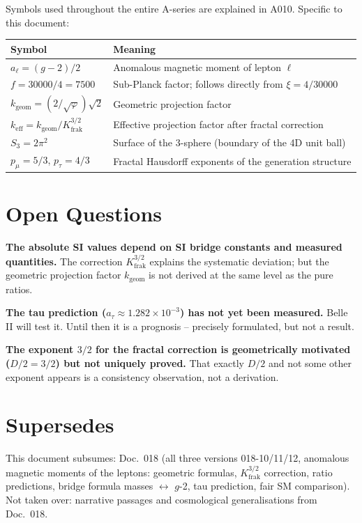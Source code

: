 Symbols used throughout the entire A-series are explained in A010.
Specific to this document:

\begin{center}
\renewcommand{\arraystretch}{1.3}
{\small\begin{tabular}{lp{9cm}}
\toprule
Symbol & Meaning \\
\midrule
$a_\ell = (g-2)/2$ & Anomalous magnetic moment of lepton $\ell$ \\
$f = 30000/4 = 7500$ & Sub-Planck factor; follows directly from $\xi=4/30000$ \\
$k_\text{geom} = (2/\sqrt\varphi)\sqrt2$ & Geometric projection factor \\
$k_\text{eff} = k_\text{geom}/K_\text{frak}^{3/2}$ & Effective projection factor
  after fractal correction \\
$S_3 = 2\pi^2$ & Surface of the 3-sphere (boundary of the 4D unit ball) \\
$p_\mu = 5/3$, $p_\tau = 4/3$ & Fractal Hausdorff exponents of the
  generation structure \\
\bottomrule
\end{tabular}}
\renewcommand{\arraystretch}{1.0}
\end{center}

\section{Open Questions}

\textbf{The absolute SI values depend on SI bridge constants and measured
quantities.} The correction $K_\text{frak}^{3/2}$ explains the systematic
deviation; but the geometric projection factor $k_\text{geom}$ is not derived
at the same level as the pure ratios.

\textbf{The tau prediction ($a_\tau\approx1{.}282\times10^{-3}$) has not yet
been measured.} Belle II will test it. Until then it is a prognosis --
precisely formulated, but not a result.

\textbf{The exponent $3/2$ for the fractal correction is geometrically motivated
($D/2=3/2$) but not uniquely proved.} That exactly $D/2$ and not some other
exponent appears is a consistency observation, not a derivation.

\section{Supersedes}

This document subsumes: Doc.~018 (all three versions 018-10/11/12, anomalous
magnetic moments of the leptons: geometric formulas, $K_\text{frak}^{3/2}$
correction, ratio predictions, bridge formula masses $\leftrightarrow$ $g$-2,
tau prediction, fair SM comparison). Not taken over: narrative passages and
cosmological generalisations from Doc.~018.

